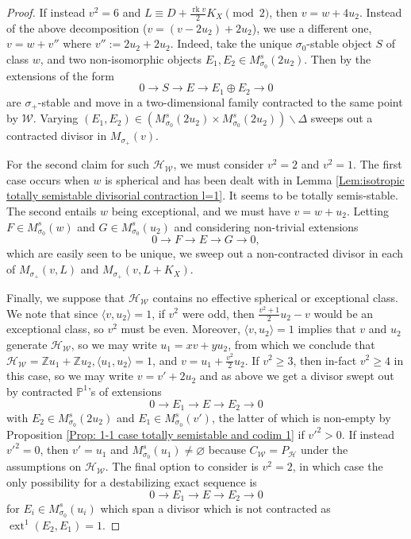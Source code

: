 \documentclass[leqno,11pt]{amsart}
\def\P{\ensuremath{\mathbb{P}}}
\def\Z{\ensuremath{\mathbb{Z}}}
\def\ext{\mathop{\mathrm{ext}}\nolimits}
\def\rk{\mathop{\mathrm{rk}}}
\theoremstyle{definition}
\def\P{\ensuremath{\mathbb{P}}}
\def\Z{\ensuremath{\mathbb{Z}}}
\def\HH{\ensuremath{\mathcal H}}
\def\WW{\ensuremath{\mathcal W}}
\begin{document}
\begin{proof}
If instead $v^2=6$ and $L\equiv D+\frac{\rk v}{2}K_X\pmod 2$, then $v=w+4u_2$.  Instead of the above decomposition ($v=(v-2u_2)+2u_2$), we use a different one, $v=w+v''$ where $v'':=2u_2+2u_2$.  Indeed, take the unique $\sigma_0$-stable object $S$ of class $w$, and two non-isomorphic objects $E_1,E_2\in M^s_{\sigma_0}(2u_2)$.  Then by \cite[Lemmas 6.1-6.3]{CH15} the extensions of the form $$0\to S\to E\to E_1\oplus E_2\to 0$$ are $\sigma_+$-stable and move in a two-dimensional family contracted to the same point by $\WW$.  Varying $(E_1,E_2)\in (M^s_{\sigma_0}(2u_2)\times M^s_{\sigma_0}(2u_2))\backslash\Delta$ sweeps out a contracted divisor in $M_{\sigma_+}(v)$.

For the second claim for such $\HH_\WW$, we must consider $v^2=2$ and $v^2=1$.  The first case occurs when $w$ is spherical and has been dealt with in Lemma \ref{Lem:isotropic totally semistable divisorial contraction l=1}. {\color{red}It seems to be totally semis-stable.} The second entails $w$ being exceptional, and we must have $v=w+u_2$.  Letting $F\in M_{\sigma_0}^s(w)$ and $G\in M_{\sigma_0}^s(u_2)$ and considering non-trivial extensions $$0\to F\to E\to G\to 0,$$ which are easily seen to be unique, we sweep out a non-contracted divisor in each of $M_{\sigma_+}(v,L)$ and $M_{\sigma_+}(v,L+K_X)$.  

Finally, we suppose that $\HH_{\WW}$ contains no effective spherical or exceptional class.  We note that since $\langle v,u_2\rangle=1$, if $v^2$ were odd, then $\frac{v^2+1}{2}u_2-v$ would be an exceptional class, so $v^2$ must be even.  Moreover, $\langle v,u_2\rangle=1$ implies that $v$ and $u_2$ generate $\HH_{\WW}$, so we may write $u_1=xv+yu_2$, from which we conclude that $\HH_{\WW}=\Z u_1+\Z u_2,\langle u_1,u_2\rangle=1$, and $v=u_1+\frac{v^2}{2}u_2$.  If $v^2\geq 3$, then in-fact $v^2\geq 4$ in this case, so we may write $v=v'+2u_2$ and as above we get a divisor swept out by contracted $\P^1$'s of extensions $$0\to E_1\to E\to E_2\to 0$$ with $E_2\in M_{\sigma_0}^s(2u_2)$ and $E_1\in M_{\sigma_0}^s(v')$, the latter of which is non-empty by Proposition \ref{Prop: 1-1 case totally semistable and codim 1} if $v'^2>0$.  If instead $v'^2=0$, then $v'=u_1$ and $M_{\sigma_0}^s(u_1)\neq\varnothing$ because $C_{\WW}=P_{\HH}$ under the assumptions on $\HH_{\WW}$.  The final option to consider is $v^2=2$, in which case the only possibility for a destabilizing exact sequence is $$0\to E_1\to E\to E_2\to 0$$ for $E_i\in M^s_{\sigma_0}(u_i)$ which span a divisor which is not contracted as $\ext^1(E_2,E_1)=1$.
\end{proof}
\end{document}
